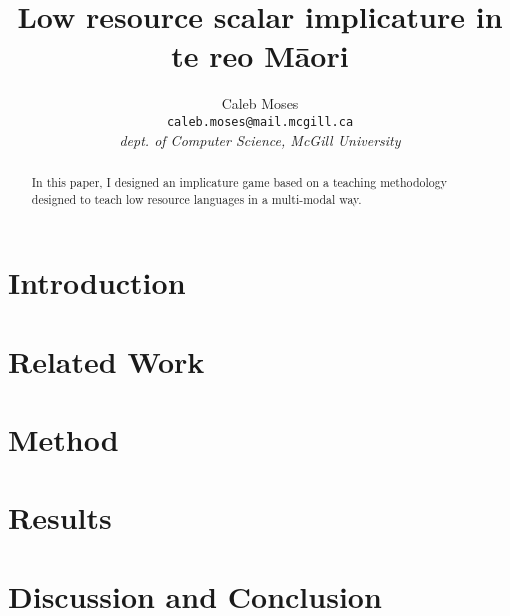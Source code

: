 \documentclass[11pt]{article}
\title{Low resource scalar implicature in te reo Māori}
\author{Caleb Moses\\
  \texttt{caleb.moses@mail.mcgill.ca} \\
  \textit{dept. of Computer Science, McGill University}
}
\begin{document}
\pagestyle{plain}
\thispagestyle{plain}

\maketitle
\begin{abstract}
In this paper, I designed an implicature game based on a teaching methodology designed to teach low resource languages in a multi-modal way.
\end{abstract}


\section{Introduction}


\section{Related Work}


\section{Method}


\section{Results}


\section{Discussion and Conclusion}


% 






\end{document}
